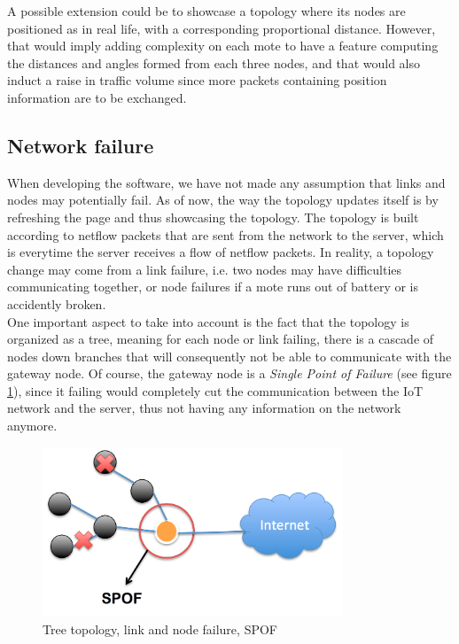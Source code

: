 A possible extension could be to showcase a topology where its nodes are positioned as in real life, with a corresponding proportional distance. However, that would imply adding complexity on each mote to have a feature computing the distances and angles formed from each three nodes, and that would also induct a raise in traffic volume since more packets containing position information are to be exchanged.

\subsection{Network failure}

When developing the software, we have not made any assumption that links and nodes may potentially fail. As of now, the way the topology updates itself is by refreshing the page and thus showcasing the topology. The topology is built according to netflow packets that are sent from the network to the server, which is everytime the server receives a flow of netflow packets. In reality, a topology change may come from a link failure, i.e. two nodes may have difficulties communicating together, or node failures if a mote runs out of battery or is accidently broken. \\

One important aspect to take into account is the fact that the topology is organized as a tree, meaning for each node or link failing, there is a cascade of nodes down branches that will consequently not be able to communicate with the gateway node. Of course, the gateway node is a \textit{Single Point of Failure} (see figure \ref{fig:spof}), since it failing would completely cut the communication between the IoT network and the server, thus not having any information on the network anymore.\\

\begin{figure}[!h]
	\centering
	\includegraphics[width=0.8\textwidth]{res/spof.png}
	\caption{Tree topology, link and node failure, SPOF}
	\label{fig:spof}
\end{figure}


